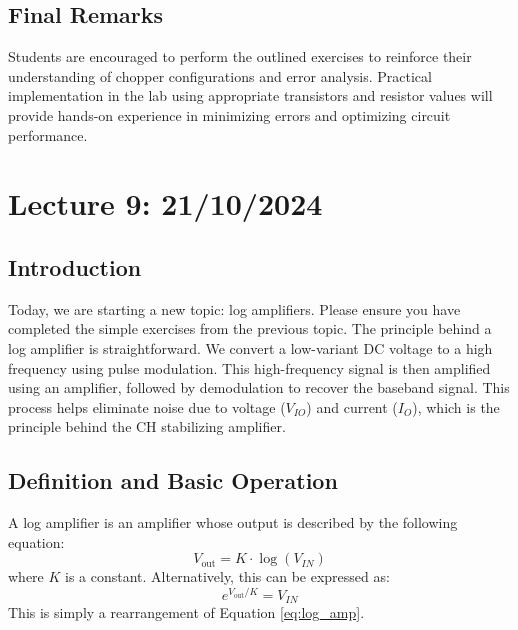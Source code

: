 \subsection{Final Remarks}
Students are encouraged to perform the outlined exercises to reinforce their understanding of chopper configurations and error analysis. Practical implementation in the lab using appropriate transistors and resistor values will provide hands-on experience in minimizing errors and optimizing circuit performance.
\newpage
\section{Lecture 9: 21/10/2024}

\subsection{Introduction}
Today, we are starting a new topic: log amplifiers. Please ensure you have completed the simple exercises from the previous topic. The principle behind a log amplifier is straightforward. We convert a low-variant DC voltage to a high frequency using pulse modulation. This high-frequency signal is then amplified using an amplifier, followed by demodulation to recover the baseband signal. This process helps eliminate noise due to voltage (\(V_{IO}\)) and current (\(I_{O}\)), which is the principle behind the CH stabilizing amplifier.

\subsection{Definition and Basic Operation}
A log amplifier is an amplifier whose output is described by the following equation:
\begin{equation}
V_{\text{out}} = K \cdot \log(V_{IN})
\label{eq:log_amp}
\end{equation}
where \(K\) is a constant. Alternatively, this can be expressed as:
\begin{equation}
e^{V_{\text{out}}/K} = V_{IN}
\label{eq:log_amp_rearranged}
\end{equation}
This is simply a rearrangement of Equation \ref{eq:log_amp}.

